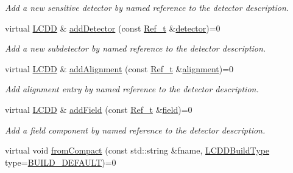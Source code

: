 \begin{DoxyCompactItemize}
\begin{DoxyCompactList}\small\item\em Add a new sensitive detector by named reference to the detector description. \end{DoxyCompactList}\item 
virtual \hyperlink{class_d_d4hep_1_1_geometry_1_1_l_c_d_d}{L\+C\+DD} \& \hyperlink{class_d_d4hep_1_1_geometry_1_1_l_c_d_d_a53a88518d0ab797a11bd61f9c567f7ac}{add\+Detector} (const \hyperlink{group___d_d4_h_e_p___g_e_o_m_e_t_r_y_ga40af83be6718bb8828a3d83dc7f8c930}{Ref\+\_\+t} \&\hyperlink{class_d_d4hep_1_1_geometry_1_1_l_c_d_d_a0ed0c4e5d72a1e07ce11cf2592d6de3e}{detector})=0
\begin{DoxyCompactList}\small\item\em Add a new subdetector by named reference to the detector description. \end{DoxyCompactList}\item 
virtual \hyperlink{class_d_d4hep_1_1_geometry_1_1_l_c_d_d}{L\+C\+DD} \& \hyperlink{class_d_d4hep_1_1_geometry_1_1_l_c_d_d_a50e3654851b950da20f19a13e36fbcc4}{add\+Alignment} (const \hyperlink{group___d_d4_h_e_p___g_e_o_m_e_t_r_y_ga40af83be6718bb8828a3d83dc7f8c930}{Ref\+\_\+t} \&\hyperlink{class_d_d4hep_1_1_geometry_1_1_l_c_d_d_a5661c5a5c9519f58e3044fa66e5393fa}{alignment})=0
\begin{DoxyCompactList}\small\item\em Add alignment entry by named reference to the detector description. \end{DoxyCompactList}\item 
virtual \hyperlink{class_d_d4hep_1_1_geometry_1_1_l_c_d_d}{L\+C\+DD} \& \hyperlink{class_d_d4hep_1_1_geometry_1_1_l_c_d_d_a91ae6cfee73a663c46f296bc403b5c63}{add\+Field} (const \hyperlink{group___d_d4_h_e_p___g_e_o_m_e_t_r_y_ga40af83be6718bb8828a3d83dc7f8c930}{Ref\+\_\+t} \&\hyperlink{class_d_d4hep_1_1_geometry_1_1_l_c_d_d_a62750fbd02e0f4e06c570d00dc9eb2ca}{field})=0
\begin{DoxyCompactList}\small\item\em Add a field component by named reference to the detector description. \end{DoxyCompactList}\item 
virtual void \hyperlink{class_d_d4hep_1_1_geometry_1_1_l_c_d_d_abc18ac1b03188da6e4400943eca4bd2e}{from\+Compact} (const std\+::string \&fname, \hyperlink{namespace_d_d4hep_acafe43ba4537ab6e999e808142965fab}{L\+C\+D\+D\+Build\+Type} type=\hyperlink{namespace_d_d4hep_acafe43ba4537ab6e999e808142965fabaceac720f961afd2369fcc9f343113a2e}{B\+U\+I\+L\+D\+\_\+\+D\+E\+F\+A\+U\+LT})=0

\end{DoxyCompactItemize}
